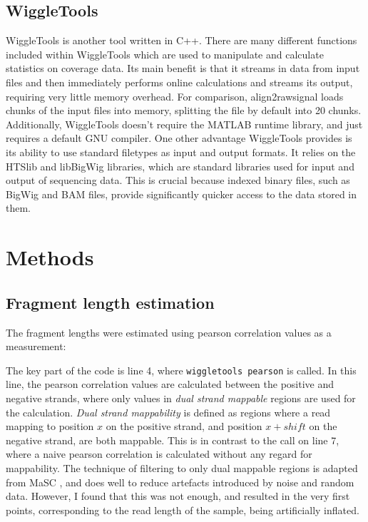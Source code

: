 \documentclass[a4paper]{article}
\begin{document}
    \subsection{WiggleTools}
    WiggleTools is another tool written in C++. There are many different functions included within WiggleTools which are
    used to manipulate and calculate statistics on coverage data. Its main benefit is that it streams in data from input files and then
    immediately performs online calculations and streams its output, requiring very little memory overhead. For comparison,
    align2rawsignal loads chunks of the input files into memory, splitting the file by default into 20 chunks. Additionally,
    WiggleTools doesn't require the MATLAB runtime library, and just requires a default GNU compiler.
    One other advantage WiggleTools provides is its ability to use standard filetypes as input and output formats. It relies on the
    HTSlib and libBigWig libraries, which are standard libraries used for input and output of sequencing data.
    This is crucial because indexed binary files, such as BigWig and BAM files, provide
    significantly quicker access to the data stored in them.

  \section{Methods}

    \subsection{Fragment length estimation}
    The fragment lengths were estimated using pearson correlation values as a measurement:

    

    The key part of the code is line 4, where \verb$wiggletools pearson$ is called. In this line, the pearson correlation
    values are calculated between the positive and negative strands, where only values in \textit{dual strand mappable}
    regions are used for the calculation. \textit{Dual strand mappability} is defined as regions where a read mapping to
    position $x$ on the positive strand, and position $x + shift$ on the negative strand, are both mappable. This is in contrast
    to the call on line 7, where a naive pearson correlation is calculated without any regard for mappability. The technique
    of filtering to only dual mappable regions is adapted from MaSC \cite{ramachandran_masc:_2013}, and does well to reduce artefacts introduced
    by noise and random data. However, I found that this was not enough, and resulted in the very first points, corresponding
    to the read length of the sample, being artificially inflated.
\end{document}
